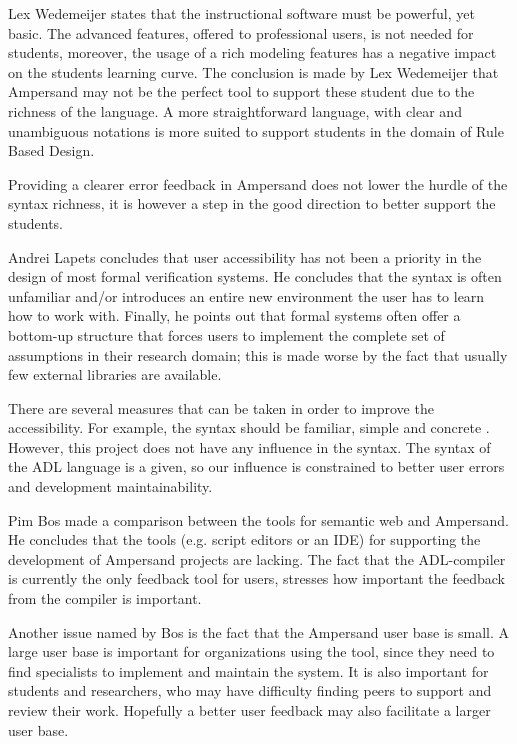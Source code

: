 Lex Wedemeijer  states that the instructional software must be powerful, yet basic.
The advanced features, offered to professional users, is not needed for students, moreover, the usage of a rich modeling features has a negative impact on the students learning curve.
The conclusion is made by Lex Wedemeijer that Ampersand may not be the perfect tool to support these student due to the richness of the language.
A more straightforward language, with clear and unambiguous notations is more suited to support students in the domain of Rule Based Design.

Providing a clearer error feedback in Ampersand does not lower the hurdle of the syntax richness, it is however a step in the good direction to better support the students.

Andrei Lapets  concludes that user accessibility has not been a priority in the design of most formal verification systems.
He concludes that the syntax is often unfamiliar and/or introduces an entire new environment the user has to learn how to work with.
Finally, he points out that formal systems often offer a bottom-up structure that forces users to implement the complete set of assumptions in their research domain; this is made worse by the fact that usually few external libraries are available.

There are several measures that can be taken in order to improve the accessibility.
For example, the syntax should be familiar, simple and concrete .
However, this project does not have any influence in the syntax.
The syntax of the ADL language is a given, so our influence is constrained to better user errors and development maintainability.

Pim Bos  made a comparison between the tools for semantic web and Ampersand.
He concludes that the tools (e.g. script editors or an IDE) for supporting the development of Ampersand projects are lacking.
The fact that the ADL-compiler is currently the only feedback tool for users, stresses how important the feedback from the compiler is important.

Another issue named by Bos is the fact that the Ampersand user base is small.
A large user base is important for organizations using the tool, since they need to find specialists to implement and maintain the system.
It is also important for students and researchers, who may have difficulty finding peers to support and review their work.
Hopefully a better user feedback may also facilitate a larger user base.

